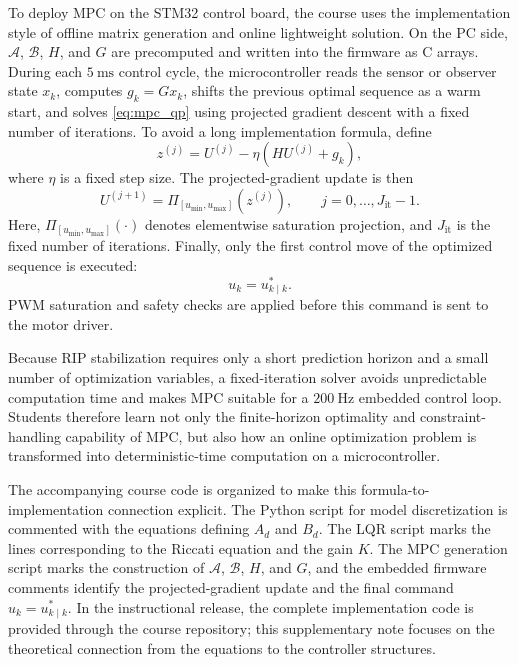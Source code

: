 \documentclass[11pt]{article}
\begin{document}
To deploy MPC on the STM32 control board, the course uses the implementation style of offline matrix generation and online lightweight solution. On the PC side, $\mathcal{A}$, $\mathcal{B}$, $H$, and $G$ are precomputed and written into the firmware as C arrays. During each $5~\mathrm{ms}$ control cycle, the microcontroller reads the sensor or observer state $x_k$, computes $g_k=Gx_k$, shifts the previous optimal sequence as a warm start, and solves \eqref{eq:mpc_qp} using projected gradient descent with a fixed number of iterations. To avoid a long implementation formula, define
\begin{equation}
z^{(j)}=U^{(j)}-\eta\left(HU^{(j)}+g_k\right),
\label{eq:pgd_z}
\end{equation}
where $\eta$ is a fixed step size. The projected-gradient update is then
\begin{equation}
U^{(j+1)}
=\Pi_{[u_{\min},u_{\max}]}\!\left(z^{(j)}\right),
\qquad j=0,\ldots,J_{\mathrm{it}}-1.
\label{eq:pgd_projection}
\end{equation}
Here, $\Pi_{[u_{\min},u_{\max}]}(\cdot)$ denotes elementwise saturation projection, and $J_{\mathrm{it}}$ is the fixed number of iterations. Finally, only the first control move of the optimized sequence is executed:
\begin{equation}
u_k=u^{*}_{k\mid k}.
\label{eq:mpc_first_move}
\end{equation}
PWM saturation and safety checks are applied before this command is sent to the motor driver.

Because RIP stabilization requires only a short prediction horizon and a small number of optimization variables, a fixed-iteration solver avoids unpredictable computation time and makes MPC suitable for a $200~\mathrm{Hz}$ embedded control loop. Students therefore learn not only the finite-horizon optimality and constraint-handling capability of MPC, but also how an online optimization problem is transformed into deterministic-time computation on a microcontroller.

The accompanying course code is organized to make this formula-to-implementation connection explicit. The Python script for model discretization is commented with the equations defining $A_d$ and $B_d$. The LQR script marks the lines corresponding to the Riccati equation and the gain $K$. The MPC generation script marks the construction of $\mathcal{A}$, $\mathcal{B}$, $H$, and $G$, and the embedded firmware comments identify the projected-gradient update and the final command $u_k=u^{*}_{k\mid k}$. In the instructional release, the complete implementation code is provided through the course repository; this supplementary note focuses on the theoretical connection from the equations to the controller structures.
\end{document}
